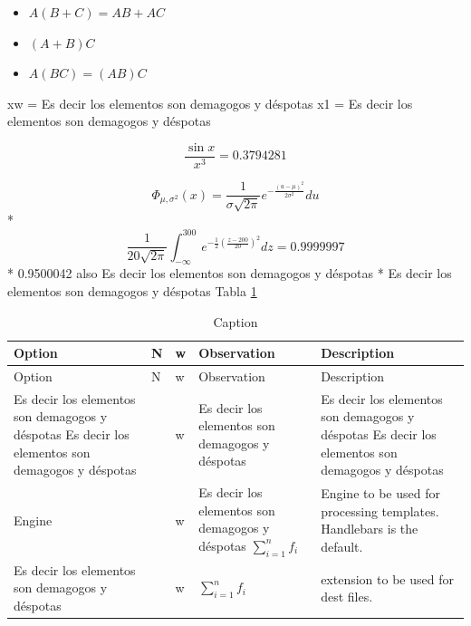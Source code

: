 \documentclass[
  10pt,
]{krantz}
\newenvironment{Shaded}{\begin{snugshade}}{\end{snugshade}}
\newcommand{\NormalTok}[1]{#1}
\newcommand{\OtherTok}[1]{\textcolor[rgb]{0.56,0.35,0.01}{#1}}
\newcommand{\StringTok}[1]{\textcolor[rgb]{0.31,0.60,0.02}{#1}}
\providecommand{\tightlist}{%
  \setlength{\itemsep}{0pt}\setlength{\parskip}{0pt}}
\theoremstyle{definition}
\theoremstyle{definition}
\theoremstyle{definition}
\theoremstyle{definition}
\theoremstyle{remark}
\begin{document}
\begin{itemize}
\tightlist
\item
  \(A(B+C)=AB+AC\)
\item
  \((A+B)C\)
\item
  \(A(BC)=(AB)C\)
\end{itemize}

\begin{Shaded}
\begin{Highlighting}[]
\NormalTok{xw }\OtherTok{=} \StringTok{\textquotesingle{}Es decir los elementos son demagogos y déspotas\textquotesingle{}} 
\NormalTok{x1 }\OtherTok{=} \StringTok{\textquotesingle{}Es decir los elementos son demagogos y déspotas\textquotesingle{}} 
\end{Highlighting}
\end{Shaded}

\[
\frac{\sin x}{x^3}
= 0.3794281
\]

\[
\Phi_{\mu , \sigma ^{2}}(x)=\frac {1}{\sigma {\sqrt {2\pi }}}e^{-{\frac {(u-\mu )^{2}}{2\sigma ^{2}}}}du
\]
* \[\frac{1}{20\sqrt{2\pi }}\int_{-\infty }^{ 300}e^{- \frac{1}{2}\left(\frac{z-200}{20}\right)^2}dz=0.9999997\]
* 0.9500042 also Es decir los elementos son demagogos y déspotas
* Es decir los elementos son demagogos y déspotas
Tabla \ref{tab:ww1}

\begin{longtable}[]{@{}
  >{\raggedleft\arraybackslash}p{}
  >{\centering\arraybackslash}p{}
  >{\raggedright\arraybackslash}p{}
  >{\raggedleft\arraybackslash}p{}
  >{\raggedright\arraybackslash}p{}@{}}
\caption{\label{tab:ww1} Caption}\tabularnewline
\toprule
Option & N & w & Observation & Description \\
\midrule
\endfirsthead
\toprule
Option & N & w & Observation & Description \\
\midrule
\endhead
Es decir los elementos son demagogos y déspotas Es decir los elementos son demagogos y déspotas & 1 & w & Es decir los elementos son demagogos y déspotas & Es decir los elementos son demagogos y déspotas Es decir los elementos son demagogos y déspotas \\
Engine & 2 & w & Es decir los elementos son demagogos y déspotas \(\sum^{n}_{i=1}{f_i}\) & Engine to be used for processing templates. Handlebars is the default. \\
Es decir los elementos son demagogos y déspotas & 3 & w & \(\sum^{n}_{i=1}{f_i}\) & extension to be used for dest files. \\
\bottomrule
\end{longtable}
\end{document}
